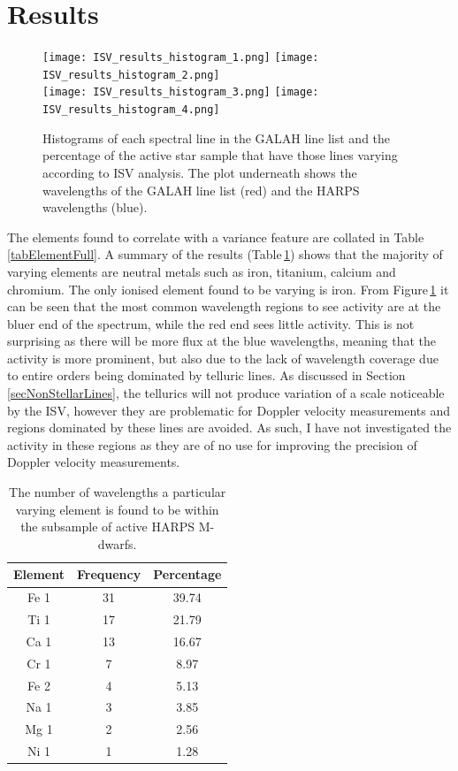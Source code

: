\section{Results}
\begin{figure}
    \hspace{-2cm}
    \captionsetup{width=.8\textwidth}
    \texttt{[image: ISV\_results\_histogram\_1.png]}
    \texttt{[image: ISV\_results\_histogram\_2.png]}\\
    \texttt{[image: ISV\_results\_histogram\_3.png]}
    \texttt{[image: ISV\_results\_histogram\_4.png]}
    \caption{Histograms of each spectral line in the GALAH line list and the percentage of the active star sample that have those lines varying according to ISV analysis. The plot underneath shows the wavelengths of the GALAH line list (red) and the HARPS wavelengths (blue).}
    \label{figISV_wavelength}
\end{figure}
The elements found to correlate with a variance feature are collated in Table\,\ref{tabElementFull}. A summary of the results (Table\,\ref{tabElementFrequency}) shows that the majority of varying elements are neutral metals such as iron, titanium, calcium and chromium. The only ionised element found to be varying is iron. From Figure\,\ref{figISV_wavelength} it can be seen that the most common wavelength regions to see activity are at the bluer end of the spectrum, while the red end sees little activity. This is not surprising as there will be more flux at the blue wavelengths, meaning that the activity is more prominent, but also due to the lack of wavelength coverage due to entire orders being dominated by telluric lines. As discussed in Section\,\ref{secNonStellarLines}, the tellurics will not produce variation of a scale noticeable by the ISV, however they are problematic for Doppler velocity measurements and regions dominated by these lines are avoided. As such, I have not investigated the activity in these regions as they are of no use for improving the precision of Doppler velocity measurements.

\begin{table}[]
    \centering
    \begin{tabular}{|c|c|c|}
    \hline
    Element & Frequency & Percentage \\
    \hline
    Fe 1 & 31 & 39.74 \\
    Ti 1 & 17 & 21.79 \\
    Ca 1 & 13 & 16.67 \\
    Cr 1 &  7 &  8.97 \\
    Fe 2 &  4 &  5.13 \\
    Na 1 &  3 &  3.85 \\
    Mg 1 &  2 &  2.56 \\
    Ni 1 &  1 &  1.28 \\
    \hline
    \end{tabular}
    \caption{The number of wavelengths a particular varying element is found to be  within the subsample of active HARPS M-dwarfs.}
    \label{tabElementFrequency}
\end{table}

